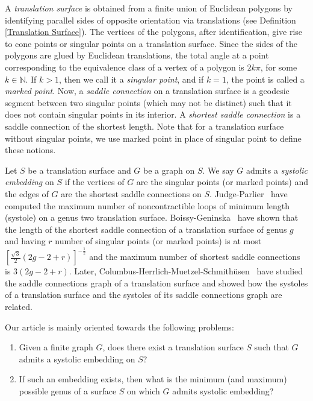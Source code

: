 \documentclass[11pt]{amsart}
\theoremstyle{plain}
\theoremstyle{definition}
\theoremstyle{remark}
\numberwithin{equation}{section}
\numberwithin{figure}{section}
\begin{document}
  A \emph{translation surface} is obtained from a finite union of Euclidean polygons by identifying parallel sides of opposite orientation via translations (see Definition \ref{Translation Surface}). The vertices of the polygons, after identification, give rise to cone points or singular points on a translation surface. Since the sides of the polygons are glued by Euclidean translations, the total angle at a point corresponding to the equivalence class of a vertex of a polygon is $2k\pi$, for some $k\in\mathbb N$. If $k>1$, then we call it a \emph{singular point}, and if $k=1$, the point is called a \emph{marked point}. Now, a \emph{saddle connection} on a translation surface is a geodesic segment between two singular points (which may not be distinct) such that it does not contain singular points in its interior. A \emph{shortest saddle connection} is a saddle connection of the shortest length. Note that for a translation surface without singular points, we use marked point in place of singular point to define these notions.
  
Let $S$ be a translation surface and $G$ be a graph on $S$. We say $G$ admits a \emph{systolic embedding} on $S$ if the vertices of $G$ are the singular points (or marked points) and the edges of $G$ are the shortest saddle connections on $S$.
Judge-Parlier~\cite{Pa19} have computed the maximum number of noncontractible loops of minimum length (systole) on a genus two translation surface. 
Boissy-Geninska~\cite{Bo21} have shown that the length of the shortest saddle connection of a translation surface of genus $g$ and having $r$ number of singular points (or marked points) is at most $\left[\frac{\sqrt{3}}{2}\left(2g-2+r\right)\right]^{-\frac{1}{2}}$ and the maximum number of shortest saddle connections is $3(2g-2+r)$. Later, Columbus-Herrlich-Muetzel-Schmithüsen~\cite{MR4790974} have studied the saddle connections graph of a translation surface and showed how the systoles of a translation surface and the systoles of its saddle connections graph are related.
 
Our article is mainly oriented towards the following problems:

\begin{enumerate}
      \item Given a finite graph $G$, does there exist a translation surface $S$ such that $G$ admits a systolic embedding on $S$?
    \item If such an embedding exists, then what is the minimum (and maximum) possible genus of a surface $S$ on which $G$ admits systolic embedding?
\end{enumerate} 
  
\end{document}

